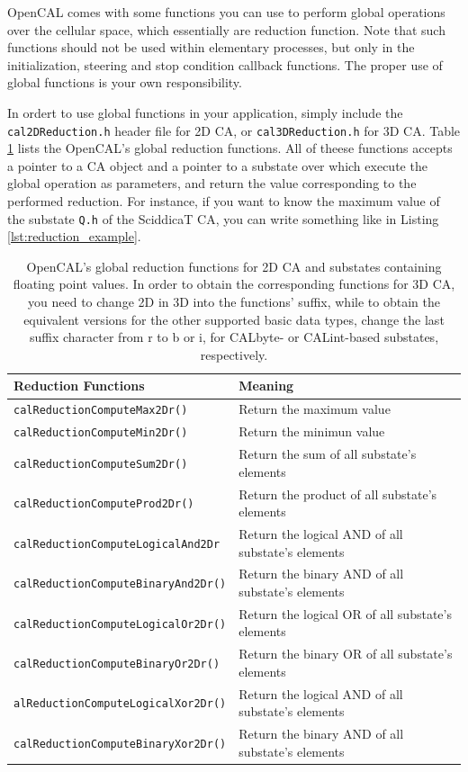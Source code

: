 OpenCAL comes with some functions you can use to perform global
operations over the cellular space, which essentially are reduction
function. Note that such functions should not be used within
elementary processes, but only in the initialization, steering and
stop condition callback functions. The proper use of global functions
is your own responsibility.

In ordert to use global functions in your application, simply include
the \verb'cal2DReduction.h' header file for 2D CA, or
\verb'cal3DReduction.h' for 3D CA. Table \ref{tab:reductions} lists
the OpenCAL's global reduction functions. All of theese functions
accepts a pointer to a CA object and a pointer to a substate over
which execute the global operation as parameters, and return the value
corresponding to the performed reduction. For instance, if you want to
know the maximum value of the substate \verb'Q.h' of the SciddicaT CA,
you can write something like in Listing \ref{lst:reduction_example}.



\begin{table}
  \centering
  \footnotesize
  \begin{tabular}{l|l}
    \hline
    Reduction Functions & Meaning \\
    \hline
    \hline
    \verb'calReductionComputeMax2Dr()'       & Return the maximum value\\
    \verb'calReductionComputeMin2Dr()'       & Return the minimun value\\
    \verb'calReductionComputeSum2Dr()'       & Return the sum of all substate's elements\\
    \verb'calReductionComputeProd2Dr()'      & Return the product of all substate's elements\\
    \verb'calReductionComputeLogicalAnd2Dr'  & Return the logical AND of all substate's elements\\
    \verb'calReductionComputeBinaryAnd2Dr()' & Return the binary AND of all substate's elements\\
    \verb'calReductionComputeLogicalOr2Dr()' & Return the logical OR of all substate's elements\\
    \verb'calReductionComputeBinaryOr2Dr()'  & Return the binary OR of all substate's elements\\
    \verb'alReductionComputeLogicalXor2Dr()' & Return the logical AND of all substate's elements\\
    \verb'calReductionComputeBinaryXor2Dr()' & Return the binary AND of all substate's elements\\
    \hline
  \end{tabular}
  \caption{OpenCAL's global reduction functions for 2D CA and
    substates containing floating point values. In order to obtain the
    corresponding functions for 3D CA, you need to change 2D in 3D
    into the functions' suffix, while to obtain the equivalent
    versions for the other supported basic data types, change the last
    suffix character from r to b or i, for CALbyte- or CALint-based
    substates, respectively.}
  \label{tab:reductions}
\end{table} 


